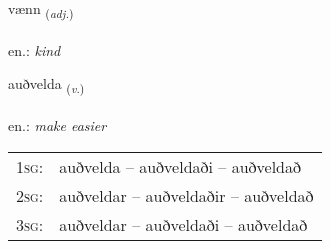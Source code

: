 \documentclass[frontgrid, backgrid]{flacards}\usepackage[]{graphicx}\usepackage[]{xcolor}
\begin{document}
\renewcommand{\flhead}{\vskip5pt \fboxsep=0pt {\small\bfseries\footnotesize Lýsingarorð | Adjective}}
\renewcommand{\fcfoot}{\vskip5pt \fboxsep=0pt \hspace{2pt}{\small\bfseries\footnotesize 2K}}

\renewcommand{\blhead}{\vskip5pt {\small\bfseries\footnotesize Lýsingarorð | Adjective }}
\renewcommand{\bcfoot}{\vskip5pt \hspace{2pt}{\small\bfseries\footnotesize 2K}}


{vænn \small{\textsubscript{(\textit{adj.})}} \\[1ex] %
\textphonetic{[vaitn̥]} \\
en.: \emph{kind} \\  [2ex]
\renewcommand*{\arraystretch}{0.8}
}

\renewcommand{\flhead}{\vskip5pt \fboxsep=0pt {\small\bfseries\footnotesize Sagnorð | Verb}}
\renewcommand{\fcfoot}{\vskip5pt \fboxsep=0pt \hspace{2pt}{\small\bfseries\footnotesize 2K}}

\renewcommand{\blhead}{\vskip5pt {\small\bfseries\footnotesize Sagnorð | Verb }}
\renewcommand{\bcfoot}{\vskip5pt \hspace{2pt}{\small\bfseries\footnotesize 2K}}


{auðvelda \small{\textsubscript{(\textit{v.})}} \\[1ex] %
\textphonetic{[œiðvɛlta]} \\
en.: \emph{make easier} \\  [2ex]
\renewcommand*{\arraystretch}{0.8}
\begin{tabular}{p{1cm}l}
\textsc{1sg}: & auðvelda -- auðveldaði -- auðveldað \\ 
\textsc{2sg}: & auðveldar -- auðveldaðir -- auðveldað \\ 
\textsc{3sg}: & auðveldar -- auðveldaði -- auðveldað \\ 
\end{tabular}
}
\end{document}
